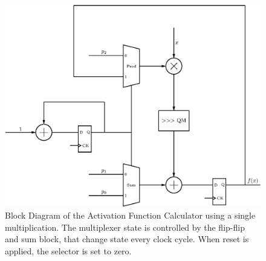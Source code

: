\begin{figure}
    \centering
    \includegraphics[width=0.9\linewidth]{figures/non-lin.eps}
    \caption[Block Diagram of the Activation Function Calculator]{Block Diagram of the Activation Function Calculator using a single multiplication. The multiplexer state is controlled by the flip-flip and sum block, that change state every clock cycle. When reset is applied, the selector is set to zero.}
    \label{fig:nonlin}
\end{figure}

